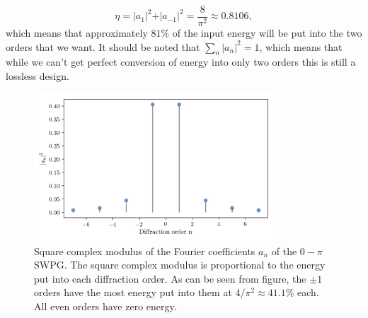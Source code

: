 \begin{equation}
	\eta=\rvert a_1\rvert^2 + \rvert a_{-1}\rvert^2 =\frac{8}{\pi^2}\approx 0.8106,
\end{equation} 
which means that approximately $81\%$ of the input energy will be put into the two orders that we want.  It should be noted that $\sum_{n}\rvert a_n\rvert^2=1$, which means that while we can't get perfect conversion of energy into only two orders this is still a lossless design.
\begin{figure}
	\centering
	\includegraphics[width=0.8\textwidth]{figures/Two_source/a_n.png}
	\caption{Square complex modulus of the Fourier coefficients $a_n$ of the $0-\pi$ SWPG. The square complex modulus is proportional to the energy put into each diffraction order.  As can be seen from figure, the $\pm1$ orders have the most energy put into them at $4/\pi^2\approx41.1\%$ each.  All even orders have zero energy.}
	\label{fig:a_n}
\end{figure}

